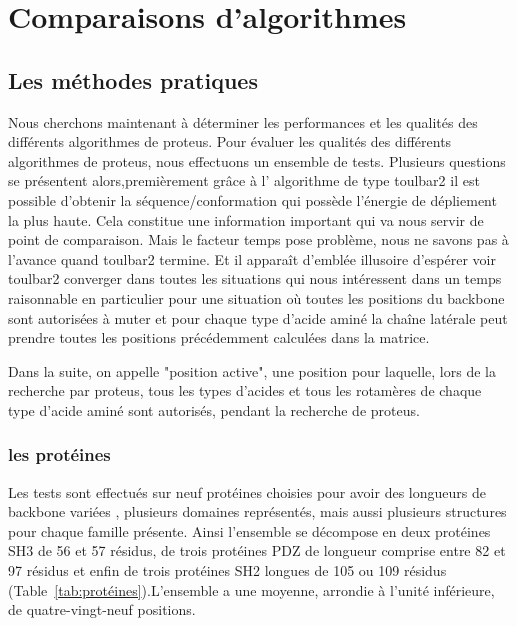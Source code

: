 \chapter{Comparaisons d'algorithmes}
\label{chap:resultats_comparaisons}


\section{Les méthodes pratiques} 
\label{sec:methodes_pratiques}
Nous cherchons maintenant à déterminer les performances et les qualités des différents algorithmes de proteus.
Pour évaluer les qualités des différents algorithmes de proteus, nous effectuons un ensemble de tests. 
Plusieurs questions se présentent alors,premièrement grâce à l' algorithme de type toulbar2 il est possible d'obtenir la séquence/conformation qui possède l'énergie de dépliement la plus haute. Cela constitue une information important qui va nous servir de point de comparaison. Mais le facteur temps pose problème, nous ne savons pas à l'avance quand toulbar2 termine. Et il apparaît d'emblée illusoire d'espérer voir toulbar2 converger dans toutes les situations qui nous intéressent dans un temps raisonnable en particulier pour une situation où  toutes les positions du  backbone sont autorisées à muter et pour chaque type d'acide aminé la chaîne latérale peut prendre toutes les positions précédemment calculées dans la matrice. 


Dans la suite, on appelle "position active", une position pour laquelle, lors de la recherche par proteus, tous les types d'acides et tous les rotamères de chaque type d'acide aminé sont autorisés, pendant la recherche de proteus. 


\subsection{les protéines}
 
Les tests sont effectués sur neuf protéines choisies pour avoir des longueurs de backbone variées , plusieurs domaines représentés, mais aussi plusieurs structures pour chaque famille présente. Ainsi l'ensemble se décompose en deux protéines SH3 de 56 et 57 résidus, de trois protéines PDZ de longueur comprise entre 82 et 97 résidus  et enfin de trois protéines SH2  longues de 105 ou 109 résidus (Table~\ref{tab:protéines}).L'ensemble a une moyenne, arrondie à l'unité inférieure, de quatre-vingt-neuf positions. 
  


